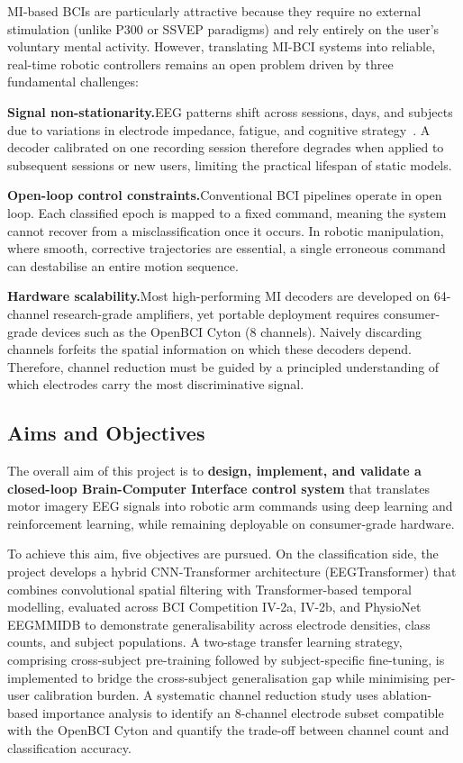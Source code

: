 \documentclass[12pt, a4paper]{article}
\begin{document}
MI-based BCIs are particularly attractive because they require no external stimulation (unlike P300 or SSVEP paradigms) and rely entirely on the user's voluntary mental activity. However, translating MI-BCI systems into reliable, real-time robotic controllers remains an open problem driven by three fundamental challenges:

\textbf{Signal non-stationarity.}\quad EEG patterns shift across sessions, days, and subjects due to variations in electrode impedance, fatigue, and cognitive strategy~\cite{hameed2025enhancing}. A decoder calibrated on one recording session therefore degrades when applied to subsequent sessions or new users, limiting the practical lifespan of static models.

\textbf{Open-loop control constraints.}\quad Conventional BCI pipelines operate in open loop. Each classified epoch is mapped to a fixed command, meaning the system cannot recover from a misclassification once it occurs. In robotic manipulation, where smooth, corrective trajectories are essential, a single erroneous command can destabilise an entire motion sequence.

\textbf{Hardware scalability.}\quad Most high-performing MI decoders are developed on 64-channel research-grade amplifiers, yet portable deployment requires consumer-grade devices such as the OpenBCI Cyton (8 channels). Naively discarding channels forfeits the spatial information on which these decoders depend. Therefore, channel reduction must be guided by a principled understanding of which electrodes carry the most discriminative signal.

\subsection{Aims and Objectives}

The overall aim of this project is to \textbf{design, implement, and validate a closed-loop Brain-Computer Interface control system} that translates motor imagery EEG signals into robotic arm commands using deep learning and reinforcement learning, while remaining deployable on consumer-grade hardware.

To achieve this aim, five objectives are pursued. On the classification side, the project develops a hybrid CNN-Transformer architecture (EEGTransformer) that combines convolutional spatial filtering with Transformer-based temporal modelling, evaluated across BCI Competition IV-2a, IV-2b, and PhysioNet EEGMMIDB to demonstrate generalisability across electrode densities, class counts, and subject populations. A two-stage transfer learning strategy, comprising cross-subject pre-training followed by subject-specific fine-tuning, is implemented to bridge the cross-subject generalisation gap while minimising per-user calibration burden. A systematic channel reduction study uses ablation-based importance analysis to identify an 8-channel electrode subset compatible with the OpenBCI Cyton and quantify the trade-off between channel count and classification accuracy.
\end{document}
